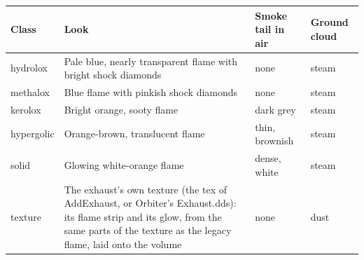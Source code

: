 \documentclass[Orbiter Developer Manual.tex]{subfiles}
\begin{document}
\begin{sloppypar}
	\begin{longtable}{ |p{}|p{}|p{}|p{}| }
	\hline\rule{0pt}{2ex}
	\textbf{Class} & \textbf{Look} & \textbf{Smoke tail in air} & \textbf{Ground cloud}\\
	\hline\rule{0pt}{2ex}
	hydrolox & Pale blue, nearly transparent flame with bright shock diamonds & none & steam\\
	\hline\rule{0pt}{2ex}
	methalox & Blue flame with pinkish shock diamonds & none & steam\\
	\hline\rule{0pt}{2ex}
	kerolox & Bright orange, sooty flame & dark grey & steam\\
	\hline\rule{0pt}{2ex}
	hypergolic & Orange-brown, translucent flame & thin, brownish & steam\\
	\hline\rule{0pt}{2ex}
	solid & Glowing white-orange flame & dense, white & steam\\
	\hline\rule{0pt}{2ex}
	texture & The exhaust's own texture (the tex of AddExhaust, or Orbiter's Exhaust.dds): its flame strip and its glow, from the same parts of the texture as the legacy flame, laid onto the volume & none & dust\\
	\hline
	\end{longtable}


\end{sloppypar}
\end{document}
